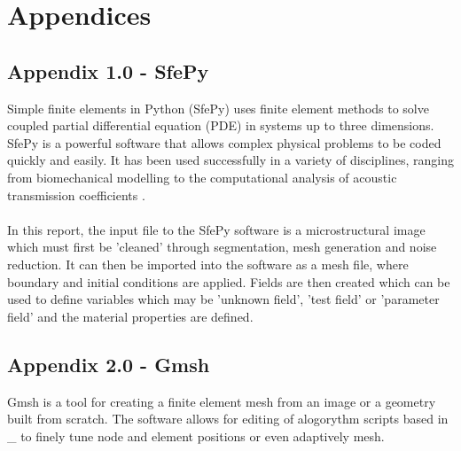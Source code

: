 \documentclass[\report.tex]{subfiles}
\begin{document}
\section{Appendices}

\subsection{Appendix 1.0 - SfePy}
Simple finite elements in Python (SfePy) uses finite element methods to solve coupled partial differential equation (PDE) in systems up to three dimensions. SfePy is a powerful software that allows complex physical problems to be coded quickly and easily. It has been used successfully in a variety of disciplines, ranging from biomechanical modelling \cite{biomedapplication} to the computational analysis of acoustic transmission coefficients \cite{AcousticTransmission}.\\ \\In this report, the input file to the SfePy software is a microstructural image which must first be 'cleaned' through segmentation, mesh generation and noise reduction. It can then be imported into the software as a mesh file, where boundary and initial conditions are applied. Fields are then created which can be used to define variables which may be 'unknown field', 'test field' or 'parameter field' \cite{FEMinSfePy} and the material properties are defined.

\subsection{Appendix 2.0 - Gmsh}
Gmsh is a tool for creating a finite element mesh from an image or a geometry built from scratch. The software allows for editing of alogorythm scripts based in _ to finely tune node and element positions or even adaptively mesh.
\end{document}
